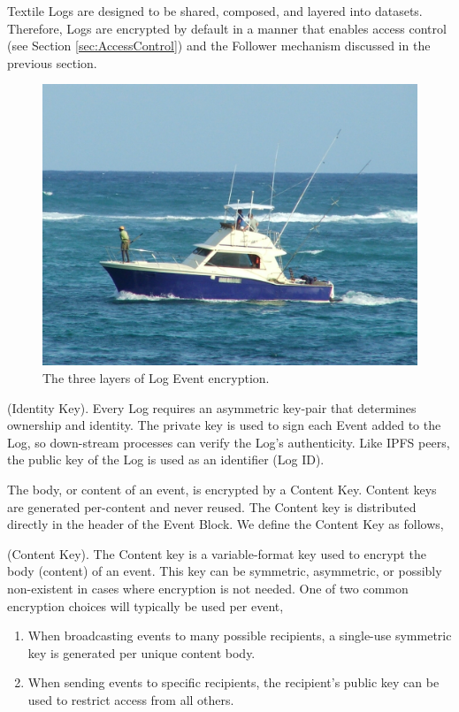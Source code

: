 \documentclass{comjnl}
\begin{document}
Textile Logs are designed to be shared, composed, and layered into datasets. Therefore, Logs are encrypted by default in a manner that enables access control (see Section  \ref{sec:AccessControl}) and the Follower mechanism discussed in the previous section.

\begin{figure}
  \includegraphics[width=\linewidth]{boat.jpg}
  \caption{The three layers of Log Event encryption.}
  \label{fig:boat1}
\end{figure}

\begin{definition}
(Identity Key). Every Log requires an asymmetric key-pair that determines ownership and identity. The private key is used to sign each Event added to the Log, so down-stream processes can verify the Log’s authenticity. Like IPFS peers, the public key of the Log is used as an identifier (Log ID).
\end{definition}

The body, or content of an event, is encrypted by a Content Key. Content keys are generated per-content and never reused. The Content key is distributed directly in the header of the Event Block. We define the Content Key as follows,

\begin{definition}
(Content Key). The Content key is a variable-format key used to encrypt the body (content) of an event. This key can be symmetric, asymmetric, or possibly non-existent in cases where encryption is not needed. One of two common encryption choices will typically be used per event, 
\begin{enumerate}
\item \label{Perf1}When broadcasting events to many possible recipients, a single-use symmetric key is generated per unique content body.
\item \label{Perf2}When sending events to specific recipients, the recipient's public key can be used to restrict access from all others.
\end{enumerate}
\end{definition}
\end{document}
